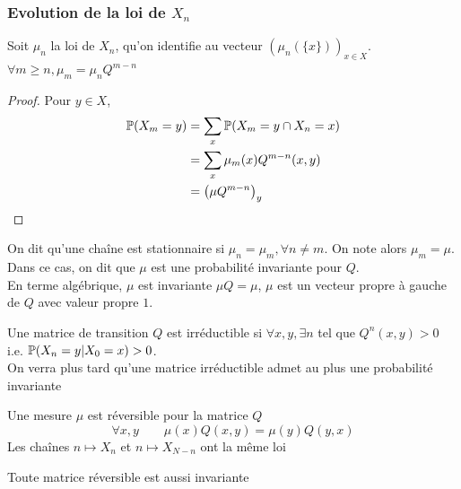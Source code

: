 \documentclass[]{report}
\begin{document}
    \subsubsection*{Evolution de la loi de $X_n$}
    
    \begin{prop}{}{}
        Soit $\mu_n$ la loi de $X_n$, qu'on identifie au vecteur $(\mu_n(\{x\}))_{x\in X}$.\\
        $\forall m\ge n,\mu_m=\mu_n Q^{m-n}$
    \end{prop}

    \begin{proof}
        Pour $y\in X$, 
        \begin{align*}
            \mathbb{P}(X_m=y)&=\sum_x \mathbb{P}(X_m=y\cap X_n=x)\\
            &=\sum_x \mu_m(x)Q^{m-n}(x,y)\\
            &=\left(\mu Q^{m-n}\right)_y
        \end{align*}
    \end{proof}

    \begin{df}{}{}
        On dit qu'une chaîne est stationnaire si $\mu_n=\mu_m,\forall n\neq m$. On note alors $\mu_m=\mu$.\\
        Dans ce cas, on dit que $\mu$ est une probabilité invariante pour $Q$.\\
        En terme algébrique, $\mu$ est invariante \ssi $\mu Q=\mu$, $\mu$ est un vecteur propre à gauche de $Q$ avec valeur propre $1$.
    \end{df}

    \begin{df}{}{}
        Une matrice de transition $Q$ est irréductible si $\forall x,y,\exists n$ tel que $Q^n(x,y)>0$ i.e. $\mathbb{P}(X_n=y|X_0=x)>0$.\\
        On verra plus tard qu'une matrice irréductible admet au plus une probabilité invariante
    \end{df}

    \begin{df}{}{}
        Une mesure $\mu$ est réversible pour la matrice $Q$ \ssi
        \[\forall x,y\qquad \mu(x)Q(x,y)=\mu(y)Q(y,x)\]
        Les chaînes $n\mapsto X_n$ et $n\mapsto X_{N-n}$ ont la même loi
    \end{df}

    \begin{prop}{}{}
        Toute matrice réversible est aussi invariante
    \end{prop}
\end{document}
